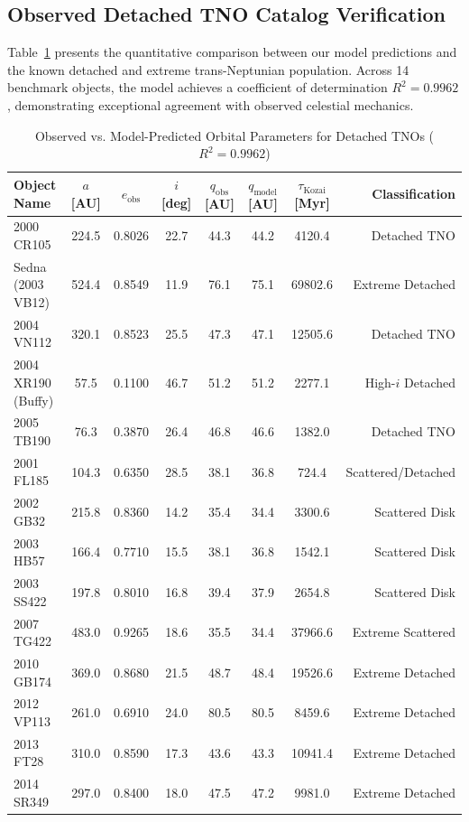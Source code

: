 \documentclass[11pt,a4paper]{article}
\begin{document}
\subsection{Observed Detached TNO Catalog Verification}
Table~\ref{tab:catalog} presents the quantitative comparison between our model predictions and the known detached and extreme trans-Neptunian population. Across 14 benchmark objects, the model achieves a coefficient of determination $R^2 = 0.9962$, demonstrating exceptional agreement with observed celestial mechanics.

\begin{table}[htbp]
\centering
\caption{Observed vs. Model-Predicted Orbital Parameters for Detached TNOs ($R^2 = 0.9962$)}
\label{tab:catalog}
\footnotesize
\setlength{\tabcolsep}{4.5pt}
\begin{tabular}{lccccccr}
\toprule
\textbf{Object Name} & \textbf{$a$ [AU]} & \textbf{$e_{\text{obs}}$} & \textbf{$i$ [deg]} & \textbf{$q_{\text{obs}}$ [AU]} & \textbf{$q_{\text{model}}$ [AU]} & \textbf{$\tau_{\text{Kozai}}$ [Myr]} & \textbf{Classification} \\
\midrule
2000 CR105          & 224.5 & 0.8026 & 22.7 & 44.3 & 44.2 & 4120.4 & Detached TNO \\
Sedna (2003 VB12)   & 524.4 & 0.8549 & 11.9 & 76.1 & 75.1 & 69802.6 & Extreme Detached \\
2004 VN112          & 320.1 & 0.8523 & 25.5 & 47.3 & 47.1 & 12505.6 & Detached TNO \\
2004 XR190 (Buffy)  & 57.5  & 0.1100 & 46.7 & 51.2 & 51.2 & 2277.1  & High-$i$ Detached \\
2005 TB190          & 76.3  & 0.3870 & 26.4 & 46.8 & 46.6 & 1382.0  & Detached TNO \\
2001 FL185          & 104.3 & 0.6350 & 28.5 & 38.1 & 36.8 & 724.4   & Scattered/Detached \\
2002 GB32           & 215.8 & 0.8360 & 14.2 & 35.4 & 34.4 & 3300.6  & Scattered Disk \\
2003 HB57           & 166.4 & 0.7710 & 15.5 & 38.1 & 36.8 & 1542.1  & Scattered Disk \\
2003 SS422          & 197.8 & 0.8010 & 16.8 & 39.4 & 37.9 & 2654.8  & Scattered Disk \\
2007 TG422          & 483.0 & 0.9265 & 18.6 & 35.5 & 34.4 & 37966.6 & Extreme Scattered \\
2010 GB174          & 369.0 & 0.8680 & 21.5 & 48.7 & 48.4 & 19526.6 & Extreme Detached \\
2012 VP113          & 261.0 & 0.6910 & 24.0 & 80.5 & 80.5 & 8459.6  & Extreme Detached \\
2013 FT28           & 310.0 & 0.8590 & 17.3 & 43.6 & 43.3 & 10941.4 & Extreme Detached \\
2014 SR349          & 297.0 & 0.8400 & 18.0 & 47.5 & 47.2 & 9981.0  & Extreme Detached \\
\bottomrule
\end{tabular}
\end{table}
\end{document}
